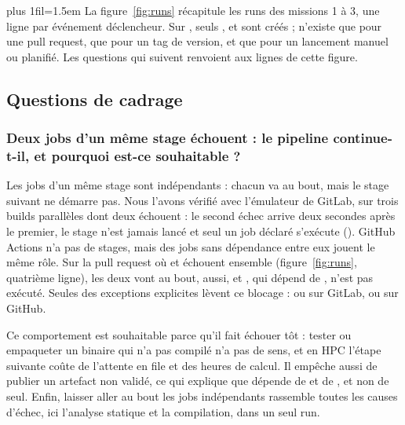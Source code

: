 \documentclass[11pt,a4paper]{article}
\makeatletter
\newcommand{\fic}[1]{\code{#1}}
\newenvironment{figtexte}{\par\medskip\noindent\begin{minipage}{\linewidth}\centering}%
  {\end{minipage}\par\medskip}
\newcommand{\commentaire}{\par\vspace{8pt}\leftskip=0pt\rightskip=0pt
  \parfillskip=0pt plus 1fil\parindent=1.5em\let\\\@normalcr}
\makeatother
\begin{document}
\begin{figtexte}

\commentaire
La figure~\ref{fig:runs} récapitule les runs des missions 1 à 3, une ligne par événement
déclencheur. Sur , seuls ,  et  sont créés ;
 n'existe que pour une pull request,  que pour un tag de version, et
 que pour un lancement manuel ou planifié. Les questions qui suivent renvoient
aux lignes de cette figure.
\end{figtexte}

\subsection{Questions de cadrage}

\subsubsection{Deux jobs d'un même stage échouent : le pipeline continue-t-il, et pourquoi est-ce souhaitable ?}

Les jobs d'un même stage sont indépendants : chacun va au bout, mais le stage suivant ne démarre
pas. Nous l'avons vérifié avec l'émulateur de GitLab, sur trois builds parallèles dont deux
échouent : le second échec arrive deux secondes après le premier, le stage  n'est
jamais lancé et seul un job déclaré  s'exécute
(\fic{logs/m1-stage-fail.txt}). GitHub Actions n'a
pas de stages, mais des jobs sans dépendance entre eux jouent le même rôle. Sur la pull request
où  et  échouent ensemble (figure~\ref{fig:runs}, quatrième ligne), les deux
vont au bout,  aussi, et , qui dépend de , n'est pas
exécuté. Seules des exceptions explicites lèvent ce blocage :  ou
 sur GitLab,  ou  sur GitHub.

Ce comportement est souhaitable parce qu'il fait échouer tôt : tester ou empaqueter un binaire
qui n'a pas compilé n'a pas de sens, et en HPC l'étape suivante coûte de l'attente en file et
des heures de calcul. Il empêche aussi de publier un artefact non validé, ce qui explique que
 dépende de  et de , et non de  seul. Enfin,
laisser aller au bout les jobs indépendants rassemble toutes les causes d'échec, ici l'analyse
statique et la compilation, dans un seul run.
\end{document}
